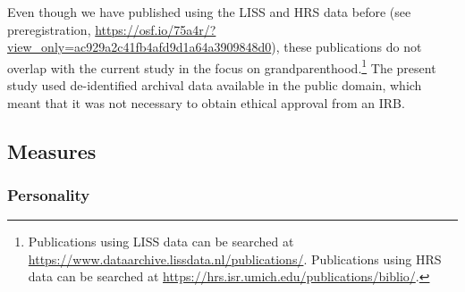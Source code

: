 \documentclass[
  english,
  man, noextraspace,floatsintext]{apa7}
\begin{document}
Even though we have published using the LISS and HRS data before (see preregistration, \url{https://osf.io/75a4r/?view_only=ac929a2c41fb4afd9d1a64a3909848d0}), these publications do not overlap with the current study in the focus on grandparenthood.\footnote{Publications using LISS data can be searched at \url{https://www.dataarchive.lissdata.nl/publications/}. Publications using HRS data can be searched at \url{https://hrs.isr.umich.edu/publications/biblio/}.} The present study used de-identified archival data available in the public domain, which meant that it was not necessary to obtain ethical approval from an IRB.

\hypertarget{measures}{%
\subsection{Measures}\label{measures}}

\hypertarget{personality}{%
\subsubsection{Personality}\label{personality}}
\end{document}
